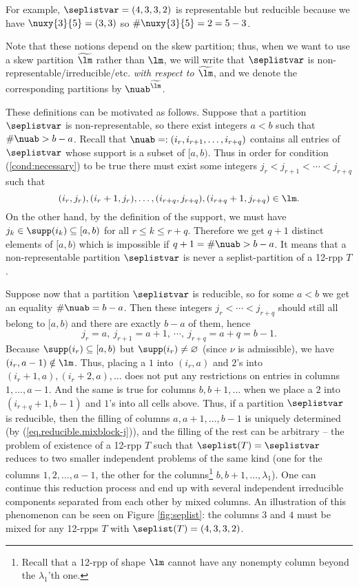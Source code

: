 \documentclass[numbers=enddot,12pt,final,onecolumn,notitlepage]{scrartcl}%
\theoremstyle{definition}
\begin{document}
For example, $\seplistvar=(4,3,3,2)$ is representable but reducible because we have $\nuxy{3}{5}=(3,3)$ so $\#\nuxy{3}{5}=2=5-3$.

Note that these notions depend on the skew partition; thus, when we want to use a skew partition $\widetilde\lm$ rather than $\lm$, we will write that $\seplistvar$ is non-representable/irreducible/etc. \textit{with respect to $\widetilde\lm$}, and we denote the corresponding partitions by $\nuab^{\widetilde{\lm}}$.

These definitions can be motivated as follows. Suppose that a partition $\seplistvar$ is non-representable, so there exist integers $a<b$ such that $\#\nuab>b-a$. Recall that $\nuab=:(i_r,i_{r+1},\dots,i_{r+q})$ contains all entries of $\seplistvar$ whose support is a subset of $[a,b)$. Thus in order for condition (\ref{cond:necessary}) to be true there must exist some integers $j_r<j_{r+1}<\cdots<j_{r+q}$ such that 
$$(i_r, j_r),(i_r+1, j_r),\dots,(i_{r+q},j_{r+q}),(i_{r+q}+1,j_{r+q})\in\lm.$$
On the other hand, by the definition of the support, we must have $j_k\in \supp(i_k)\subseteq [a,b)$ for all $r\leq k\leq r+q$. Therefore we get $q+1$ distinct elements of $[a,b)$ which is impossible if $q+1=\#\nuab>b-a$. It means that a non-representable partition $\seplistvar$ is never a seplist-partition of a 12-rpp $T$. 

Suppose now that a partition $\seplistvar$ is reducible, so for some $a<b$ we get an equality $\#\nuab=b-a$. Then these integers $j_r<\cdots<j_{r+q}$ should still all belong to $[a,b)$ and there are exactly $b-a$ of them, hence 
\begin{equation}
j_r=a,\ j_{r+1}=a+1,\ \cdots,\ j_{r+q}=a+q=b-1 .
\label{eq.reducible.mixblock-j}
\end{equation}
Because $\supp(i_r)\subseteq[a,b)$ but $\supp(i_r)\neq\varnothing$ (since $\nu$ is admissible), we have $(i_r,a-1)\notin\lm$. Thus, placing a $1$ into $(i_r,a)$ and $2$'s into $(i_r+1,a),(i_r+2,a),\dots$ does not put any restrictions on entries in columns $1,\dots, a-1$. And the same is true for columns $b,b+1,\dots$ when we place a $2$ into $(i_{r+q}+1,b-1)$ and $1$'s into all cells above. Thus, if a partition $\seplistvar$ is reducible, then the filling of columns $a,a+1,\dots, b-1$ is uniquely determined (by (\ref{eq.reducible.mixblock-j})), and the filling of the rest can be arbitrary -- the problem of existence of a 12-rpp $T$ such that $\seplist(T)=\seplistvar$ reduces to two smaller independent problems of the same kind (one for the columns $1,2,\ldots,a-1$, the other for the columns\footnote{Recall that a 12-rpp of shape $\lm$ cannot have any nonempty column beyond the $\lambda_1$'th one.} $b,b+1,\ldots,\lambda_1$). One can continue this reduction process and end up with several independent irreducible components separated from each other by mixed columns. An illustration of this phenomenon can be seen on Figure \ref{fig:seplist}: the columns $3$ and $4$ must be mixed for any 12-rpps $T$ with $\seplist(T)=(4,3,3,2)$.
\end{document}
